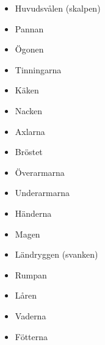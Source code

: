 \documentclass[swedish,a4paper]{book}
\begin{document}
\setlength{\columnsep}{0pt}
  \begin{multicols}{2}
    \begin{itemize}\setlength\leftmargin{0pt}\setlength{}\setlength{}\setlength{}\setlength\itemindent{0pt}
\item[\tickbox{}] Huvudsvålen (skalpen)
\item[\tickbox{}] Pannan
\item[\tickbox{}] Ögonen
\item[\tickbox{}] Tinningarna
\item[\tickbox{}] Käken
\item[\tickbox{}] Nacken
\item[\tickbox{}] Axlarna
\item[\tickbox{}] Bröstet
\item[\tickbox{}] Överarmarna
\item[\tickbox{}] Underarmarna
\item[\tickbox{}] Händerna
\item[\tickbox{}] Magen
\item[\tickbox{}] Ländryggen (svanken)
\item[\tickbox{}] Rumpan
\item[\tickbox{}] Låren
\item[\tickbox{}] Vaderna
\item[\tickbox{}] Fötterna
    \end{itemize}
  \end{multicols}


\end{document}
